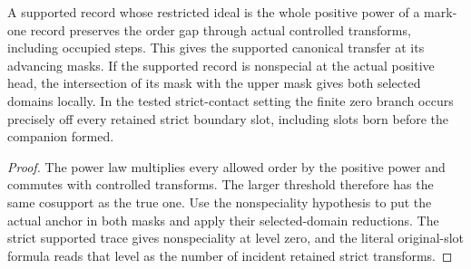 \begin{theorem}
\label{hir:g1-advancing-support-power-gap}
\leanok
A supported record whose restricted ideal is the whole positive
power of a mark-one record preserves the order gap through actual
controlled transforms, including occupied steps. This gives the
supported canonical transfer at its advancing masks. If the
supported record is nonspecial at the actual positive head, the
intersection of its mask with the upper mask gives both selected
domains locally. In the tested strict-contact setting the finite
zero branch occurs precisely off every retained strict boundary
slot, including slots born before the companion formed.
\end{theorem}
\begin{proof}
The power law multiplies every allowed order by the positive
power and commutes with controlled transforms. The larger
threshold therefore has the same cosupport as the true one.
Use the nonspeciality hypothesis to put the actual anchor in
both masks and apply their selected-domain reductions. The
strict supported trace gives nonspeciality at level zero, and
the literal original-slot formula reads that level as the
number of incident retained strict transforms.
\end{proof}

